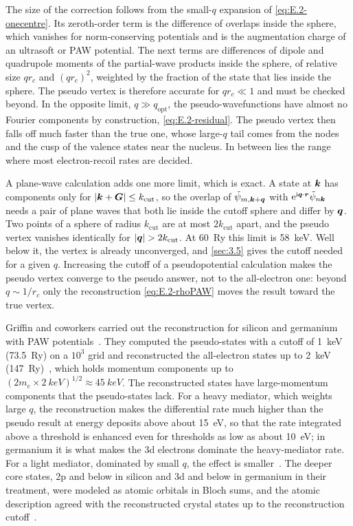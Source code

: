 The size of the correction follows from the small-$q$ expansion of \cref{eq:E.2-onecentre}. Its zeroth-order term is the difference of overlaps inside the sphere, which vanishes for norm-conserving potentials and is the augmentation charge of an ultrasoft or PAW potential. The next terms are differences of dipole and quadrupole moments of the partial-wave products inside the sphere, of relative size $q r_c$ and $(qr_c)^2$, weighted by the fraction of the state that lies inside the sphere. The pseudo vertex is therefore accurate for $qr_c \ll 1$ and must be checked beyond. In the opposite limit, $q \gg q_{\mathrm{opt}}$, the pseudo-wavefunctions have almost no Fourier components by construction, \cref{eq:E.2-residual}. The pseudo vertex then falls off much faster than the true one, whose large-$q$ tail comes from the nodes and the cusp of the valence states near the nucleus. In between lies the range where most electron-recoil rates are decided.

A plane-wave calculation adds one more limit, which is exact. A state at $\bm{k}$ has components only for $|\bm{k} + \bm{G}| \le k_{\mathrm{cut}}$, so the overlap of $\tilde\psi_{m,\bm{k}+\bm{q}}$ with $\mathrm{e}^{\mathrm{i}\bm{q}\cdot\bm{r}}\tilde\psi_{n\bm{k}}$ needs a pair of plane waves that both lie inside the cutoff sphere and differ by $\bm{q}$. Two points of a sphere of radius $k_{\mathrm{cut}}$ are at most $2k_{\mathrm{cut}}$ apart, and the pseudo vertex vanishes identically for $|\bm{q}| > 2k_{\mathrm{cut}}$. At \SI{60}{Ry} this limit is \SI{58}{keV}. Well below it, the vertex is already unconverged, and \cref{sec:3.5} gives the cutoff needed for a given $q$. Increasing the cutoff of a pseudopotential calculation makes the pseudo vertex converge to the pseudo answer, not to the all-electron one: beyond $q \sim 1/r_c$ only the reconstruction \cref{eq:E.2-rhoPAW} moves the result toward the true vertex.

Griffin and coworkers carried out the reconstruction for silicon and germanium with PAW potentials~\cite{griffin2021extended}. They computed the pseudo-states with a cutoff of \SI{1}{keV} (\SI{73.5}{Ry}) on a $10^3$ grid and reconstructed the all-electron states up to \SI{2}{keV} (\SI{147}{Ry})~\cite[Sect.~2.1]{griffin2021extended}, which holds momentum components up to $(2m_e\times\SI{2}{keV})^{1/2} \approx \SI{45}{keV}$. The reconstructed states have large-momentum components that the pseudo-states lack. For a heavy mediator, which weights large $q$, the reconstruction makes the differential rate much higher than the pseudo result at energy deposits above about \SI{15}{eV}, so that the rate integrated above a threshold is enhanced even for thresholds as low as about \SI{10}{eV}; in germanium it is what makes the 3d electrons dominate the heavy-mediator rate. For a light mediator, dominated by small $q$, the effect is smaller~\cite[Sects.~1 and~3.1]{griffin2021extended}. The deeper core states, 2p and below in silicon and 3d and below in germanium in their treatment, were modeled as atomic orbitals in Bloch sums, and the atomic description agreed with the reconstructed crystal states up to the reconstruction cutoff~\cite[Sect.~2.2]{griffin2021extended}.

